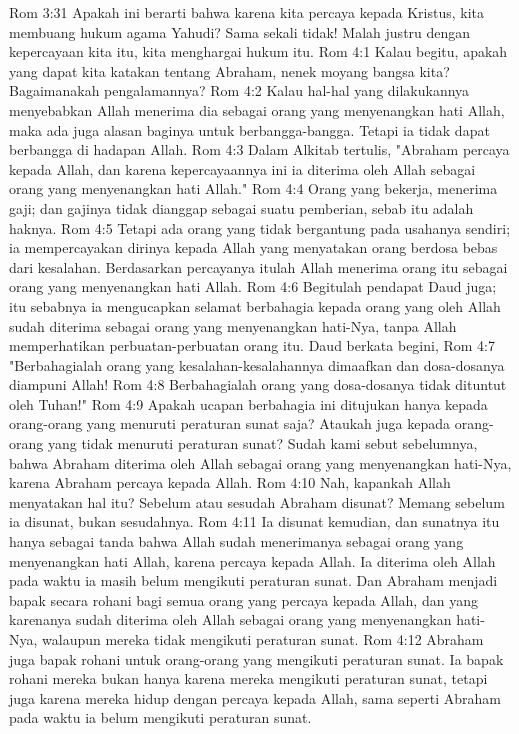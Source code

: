 Rom 3:31  Apakah ini berarti bahwa karena kita percaya kepada Kristus, kita membuang hukum agama Yahudi? Sama sekali tidak! Malah justru dengan kepercayaan kita itu, kita menghargai hukum itu.
Rom 4:1  Kalau begitu, apakah yang dapat kita katakan tentang Abraham, nenek moyang bangsa kita? Bagaimanakah pengalamannya?
Rom 4:2  Kalau hal-hal yang dilakukannya menyebabkan Allah menerima dia sebagai orang yang menyenangkan hati Allah, maka ada juga alasan baginya untuk berbangga-bangga. Tetapi ia tidak dapat berbangga di hadapan Allah.
Rom 4:3  Dalam Alkitab tertulis, "Abraham percaya kepada Allah, dan karena kepercayaannya ini ia diterima oleh Allah sebagai orang yang menyenangkan hati Allah."
Rom 4:4  Orang yang bekerja, menerima gaji; dan gajinya tidak dianggap sebagai suatu pemberian, sebab itu adalah haknya.
Rom 4:5  Tetapi ada orang yang tidak bergantung pada usahanya sendiri; ia mempercayakan dirinya kepada Allah yang menyatakan orang berdosa bebas dari kesalahan. Berdasarkan percayanya itulah Allah menerima orang itu sebagai orang yang menyenangkan hati Allah.
Rom 4:6  Begitulah pendapat Daud juga; itu sebabnya ia mengucapkan selamat berbahagia kepada orang yang oleh Allah sudah diterima sebagai orang yang menyenangkan hati-Nya, tanpa Allah memperhatikan perbuatan-perbuatan orang itu. Daud berkata begini,
Rom 4:7  "Berbahagialah orang yang kesalahan-kesalahannya dimaafkan dan dosa-dosanya diampuni Allah!
Rom 4:8  Berbahagialah orang yang dosa-dosanya tidak dituntut oleh Tuhan!"
Rom 4:9  Apakah ucapan berbahagia ini ditujukan hanya kepada orang-orang yang menuruti peraturan sunat saja? Ataukah juga kepada orang-orang yang tidak menuruti peraturan sunat? Sudah kami sebut sebelumnya, bahwa Abraham diterima oleh Allah sebagai orang yang menyenangkan hati-Nya, karena Abraham percaya kepada Allah.
Rom 4:10  Nah, kapankah Allah menyatakan hal itu? Sebelum atau sesudah Abraham disunat? Memang sebelum ia disunat, bukan sesudahnya.
Rom 4:11  Ia disunat kemudian, dan sunatnya itu hanya sebagai tanda bahwa Allah sudah menerimanya sebagai orang yang menyenangkan hati Allah, karena percaya kepada Allah. Ia diterima oleh Allah pada waktu ia masih belum mengikuti peraturan sunat. Dan Abraham menjadi bapak secara rohani bagi semua orang yang percaya kepada Allah, dan yang karenanya sudah diterima oleh Allah sebagai orang yang menyenangkan hati-Nya, walaupun mereka tidak mengikuti peraturan sunat.
Rom 4:12  Abraham juga bapak rohani untuk orang-orang yang mengikuti peraturan sunat. Ia bapak rohani mereka bukan hanya karena mereka mengikuti peraturan sunat, tetapi juga karena mereka hidup dengan percaya kepada Allah, sama seperti Abraham pada waktu ia belum mengikuti peraturan sunat.
